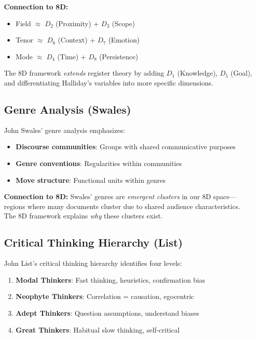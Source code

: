 \textbf{Connection to 8D:}
\begin{itemize}[nosep]
\item Field $\approx$ $D_2$ (Proximity) + $D_3$ (Scope)
\item Tenor $\approx$ $D_6$ (Context) + $D_7$ (Emotion)
\item Mode $\approx$ $D_4$ (Time) + $D_8$ (Persistence)
\end{itemize}

The 8D framework \textit{extends} register theory by adding $D_1$ (Knowledge),
$D_5$ (Goal), and differentiating Halliday's variables into more specific dimensions.

\subsection{Genre Analysis (Swales)}

John Swales' genre analysis \citep{swales1990} emphasizes:

\begin{itemize}[nosep]
\item \textbf{Discourse communities}: Groups with shared communicative purposes
\item \textbf{Genre conventions}: Regularities within communities
\item \textbf{Move structure}: Functional units within genres
\end{itemize}

\textbf{Connection to 8D:}
Swales' genres are \textit{emergent clusters} in our 8D space---regions where
many documents cluster due to shared audience characteristics.
The 8D framework explains \textit{why} these clusters exist.

\subsection{Critical Thinking Hierarchy (List)}

John List's critical thinking hierarchy \citep{list2024} identifies four levels:

\begin{enumerate}[nosep]
\item \textbf{Modal Thinkers}: Fast thinking, heuristics, confirmation bias
\item \textbf{Neophyte Thinkers}: Correlation = causation, egocentric
\item \textbf{Adept Thinkers}: Question assumptions, understand biases
\item \textbf{Great Thinkers}: Habitual slow thinking, self-critical
\end{enumerate}

